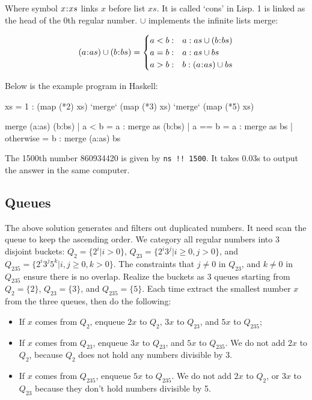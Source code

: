 \documentclass[b5paper]{article}
\begin{document}
Where symbol $x \mathbin{\!:\!} xs$ links $x$ before list $xs$. It is called `cons' in Lisp. 1 is linked as the head of the 0th regular number. $\cup$ implements the infinite lists merge:

\[
(a \cons as) \cup (b \cons bs) = \begin{cases}
  a < b: & a : as \cup (b \cons bs) \\
  a = b: & a : as \cup bs \\
  a > b: & b : (a \cons as) \cup bs \\
\end{cases}
\]

Below is the example program in Haskell:

\begin{Haskell}
xs = 1 : (map (*2) xs) `merge` (map (*3) xs) `merge` (map (*5) xs)

merge (a:as) (b:bs) | a < b = a : merge as (b:bs)
                    | a == b = a : merge as bs
                    | otherwise = b : merge (a:as) bs
\end{Haskell}

The 1500th number 860934420 is given by \texttt{ns !! 1500}. It takes 0.03s to output the answer in the same computer.

\subsection*{Queues}
The above solution generates and filters out duplicated numbers. It need scan the queue to keep the ascending order. We category all regular numbers into 3 disjoint buckets: $Q_2 = \{2^i | i > 0\}$, $Q_{23} = \{ 2^i3^j | i \geq 0, j > 0 \}$, and $Q_{235} = \{ 2^i3^j5^k | i,j \geq 0, k > 0\}$. The constraints that $j \neq 0$ in $Q_{23}$, and $k \neq 0$ in $Q_{235}$ ensure there is no overlap. Realize the buckets as 3 queues starting from $Q_2 = \{ 2 \}$, $Q_{23} = \{ 3\}$, and $Q_{235} = \{ 5 \}$. Each time extract the smallest number $x$ from the three queues, then do the following:

\begin{itemize}
\item If $x$ comes from $Q_2$, enqueue $2x$ to $Q_2$, $3x$ to $Q_{23}$, and $5x$ to $Q_{235}$;
\item If $x$ comes from $Q_{23}$, enqueue $3x$ to $Q_{23}$, and $5x$ to $Q_{235}$. We do not add $2x$ to $Q_2$, because $Q_2$ does not hold any numbers divisible by 3.
\item If $x$ comes from $Q_{235}$, enqueue $5x$ to $Q_{235}$. We do not add $2x$ to $Q_2$, or $3x$ to $Q_{23}$ because they don't hold numbers divisible by 5.
\end{itemize}
\end{document}
